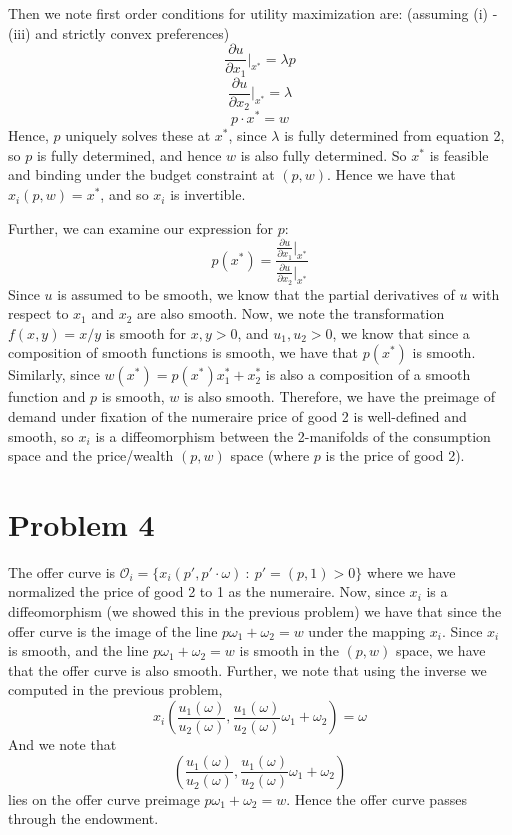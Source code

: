 \documentclass[10pt,letter]{article}
\begin{document}
Then we note first order conditions for utility maximization are: (assuming (i) - (iii) and strictly convex preferences)
\[ \frac{\partial u}{\partial x_1} \Bigr|_{x^*} = \lambda p \]
\[ \frac{\partial u}{\partial x_2} \Bigr|_{x^*} = \lambda  \]
\[ p \cdot x^* = w  \]
Hence, $p$ uniquely solves these at $x^*$, since $\lambda$ is fully determined from equation 2, so $p$ is fully determined, and hence $w$ is also fully determined. So $x^*$ is feasible and binding under the budget constraint at $(p,w)$. Hence we have that
$x_i(p,w) = x^*$, and so $x_i$ is invertible.

Further, we can examine our expression for $p$:
\[ p(x^*) = \frac{\frac{\partial u}{\partial x_1} \Bigr|_{x^*}}{\frac{\partial u}{\partial x_2} \Bigr|_{x^*}} \]
Since $u$ is assumed to be smooth, we know that the partial derivatives of $u$ with respect to $x_1$ and $x_2$ are also smooth. Now, we note the transformation $f(x,y) = x/y$ is smooth for $x,y > 0$, and $u_1, u_2 > 0$, we know that since a composition of smooth functions is smooth, we have that $p(x^*)$ is smooth. Similarly, since $w(x^*) = p(x^*) x^*_1 + x^*_2$ is also a composition of a smooth function and $p$ is smooth, $w$ is also smooth. Therefore, we have the preimage of demand under fixation of the numeraire price of good 2 is well-defined and smooth, so $x_i$ is a diffeomorphism between the 2-manifolds of the consumption space and the price/wealth $(p,w)$ space (where $p$ is the price of good 2).

\section*{Problem 4}

The offer curve is $\mathcal{O}_i = \{ x_i(p', p' \cdot \omega) \ : \ p' = (p, 1) > 0 \} $ where we have normalized the price of good 2 to 1 as the numeraire.
Now, since $x_i$ is a diffeomorphism (we showed this in the previous problem) we have that since the offer curve is the image of the line $p \omega_1 + \omega_2 = w$ under the mapping $x_i$. Since $x_i$ is smooth, and the line $p \omega_1 + \omega_2 = w$ is smooth in the $(p,w)$ space, we have that the offer curve is also smooth. Further, we note that using the inverse we computed in the previous problem,
\[ x_i \left( \frac{u_1(\omega)}{u_2(\omega)}, \frac{u_1(\omega)}{u_2(\omega)}\omega_1  + \omega_2 \right) = \omega \]
And we note that
\[ \left( \frac{u_1(\omega)}{u_2(\omega)}, \frac{u_1(\omega)}{u_2(\omega)}\omega_1  + \omega_2 \right) \]
lies on the offer curve preimage $p \omega_1 + \omega_2 = w$. Hence the offer curve passes through the endowment.
\end{document}
